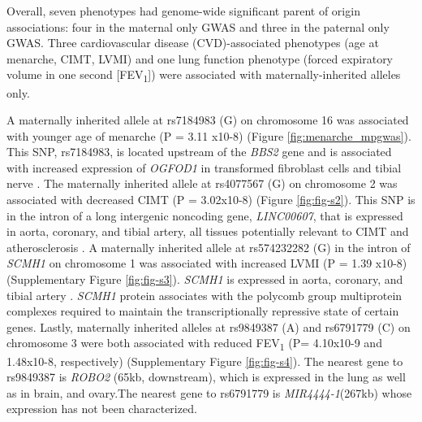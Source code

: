 Overall, seven phenotypes had genome-wide significant parent of origin associations: four in the maternal only GWAS and three in the paternal only GWAS. Three cardiovascular disease (CVD)-associated phenotypes (age at menarche, CIMT, LVMI) and one lung function phenotype (forced expiratory volume in one second [FEV\textsubscript{1}]) were associated with maternally-inherited alleles only. 

A maternally inherited allele at rs7184983 (G) on chromosome 16 was associated with younger age of menarche (P = 3.11 x10-8) (Figure \ref{fig:menarche_mpgwas}). This SNP, rs7184983, is located upstream of the \emph{BBS2} gene and is associated with increased expression of \emph{OGFOD1} in transformed fibroblast cells and tibial nerve \cite{Consortium2015}. The maternally inherited allele at rs4077567 (G) on chromosome 2 was associated with decreased CIMT (P = 3.02x10-8) (Figure \ref{fig:fig-s2}). This SNP is in the intron of a long intergenic noncoding gene, \emph{LINC00607}, that  is expressed in aorta, coronary, and tibial artery, all tissues potentially relevant to CIMT and atherosclerosis \cite{Consortium2015}. A maternally inherited allele at rs574232282 (G) in the intron of \emph{SCMH1} on chromosome 1 was associated with increased LVMI (P = 1.39 x10-8) (Supplementary Figure \ref{fig:fig-s3}). \emph{SCMH1} is expressed in aorta, coronary, and tibial artery \cite{Consortium2015}. \emph{SCMH1} protein associates with the polycomb group multiprotein complexes required to maintain the transcriptionally repressive state of certain genes\cite{Consortium2015}. Lastly, maternally inherited alleles at rs9849387 (A) and rs6791779 (C) on chromosome 3 were both associated with reduced FEV\textsubscript{1} (P= 4.10x10-9 and 1.48x10-8, respectively) (Supplementary Figure \ref{fig:fig-s4}). The nearest gene to rs9849387 is \emph{ROBO2} (65kb, downstream), which is expressed in the lung as well as in brain, and ovary\cite{Consortium2015}.The nearest gene to rs6791779 is \emph{MIR4444-1}(267kb) whose expression has not been characterized.

